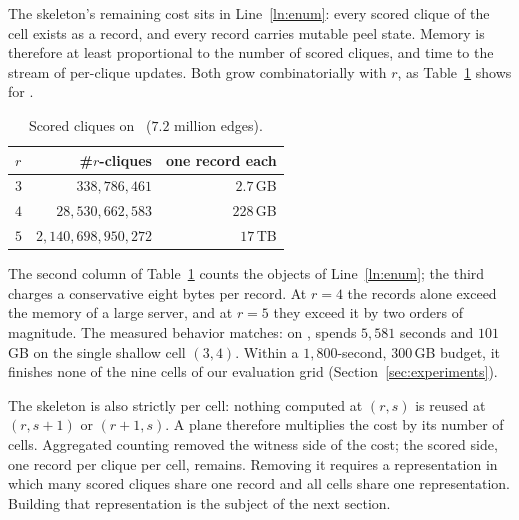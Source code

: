 The skeleton's remaining cost sits in Line~\ref{ln:enum}: every scored clique of the cell exists as a record, and every record carries mutable peel state.
%
Memory is therefore at least proportional to the number of scored cliques, and time to the stream of per-clique updates.
%
Both grow combinatorially with $r$, as Table~\ref{tab:objects} shows for \webit.

\begin{table}[t]
\centering
\caption{Scored cliques on \webit\ ($7.2$ million edges).}\label{tab:objects}
\small
\begin{tabular}{@{}lrr@{}}
\toprule
$r$ & \#$r$-cliques & one record each\\
\midrule
$3$ & $338{,}786{,}461$ & $2.7$\,GB\\
$4$ & $28{,}530{,}662{,}583$ & $228$\,GB\\
$5$ & $2{,}140{,}698{,}950{,}272$ & $17$\,TB\\
\bottomrule
\end{tabular}
\end{table}

The second column of Table~\ref{tab:objects} counts the objects of Line~\ref{ln:enum}; the third charges a conservative eight bytes per record.
%
At $r=4$ the records alone exceed the memory of a large server, and at $r=5$ they exceed it by two orders of magnitude.
%
The measured behavior matches: on \webit, \cnd{} spends $5{,}581$ seconds and $101$\,GB on the single shallow cell $(3,4)$.
%
Within a $1{,}800$-second, $300$\,GB budget, it finishes none of the nine cells of our evaluation grid (Section~\ref{sec:experiments}).

The skeleton is also strictly per cell: nothing computed at $(r,s)$ is reused at $(r,s{+}1)$ or $(r{+}1,s)$.
%
A plane therefore multiplies the cost by its number of cells.
%
Aggregated counting removed the witness side of the cost; the scored side, one record per clique per cell, remains.
%
Removing it requires a representation in which many scored cliques share one record and all cells share one representation.
%
Building that representation is the subject of the next section.
